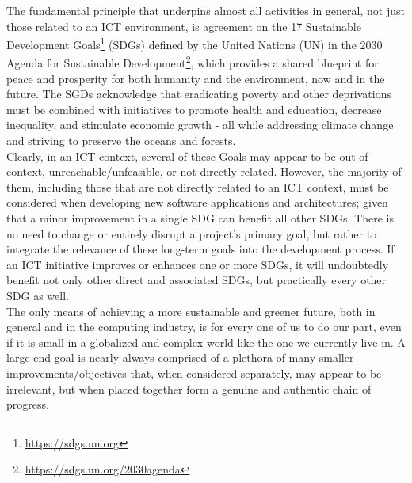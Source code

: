 The fundamental principle that underpins almost all activities in general, not just
those related to an ICT environment, is agreement on the 17 Sustainable
Development Goals\footnote{\url{https://sdgs.un.org}} (SDGs) defined by the
United Nations (UN) in the 2030 Agenda for Sustainable Development\footnote{\url{https://sdgs.un.org/2030agenda}},
which provides a shared blueprint for peace and prosperity for both humanity and
the environment, now and in the future. The SGDs acknowledge that eradicating poverty
and other deprivations must be combined with initiatives to promote health and education,
decrease inequality, and stimulate economic growth - all while addressing climate
change and striving to preserve the oceans and forests. \\ %
Clearly, in an ICT context, several of these Goals may appear to be out-of-context,
unreachable/unfeasible, or not directly related. However, the majority of them,
including those that are not directly related to an ICT context, must be considered
when developing new software applications and architectures; given that a minor
improvement in a single SDG can benefit all other SDGs. There is no need to change
or entirely disrupt a project's primary goal, but rather to integrate the
relevance of these long-term goals into the development process. If an ICT initiative
improves or enhances one or more SDGs, it will undoubtedly benefit not only
other direct and associated SDGs, but practically every other SDG as well. \\ %
The only means of achieving a more sustainable and greener future, both in
general and in the computing industry, is for every one of us to do our part,
even if it is small in a globalized and complex world like the one we currently
live in. A large end goal is nearly always comprised of a plethora of many smaller
improvements/objectives that, when considered separately, may appear to be irrelevant,
but when placed together form a genuine and authentic chain of progress.

